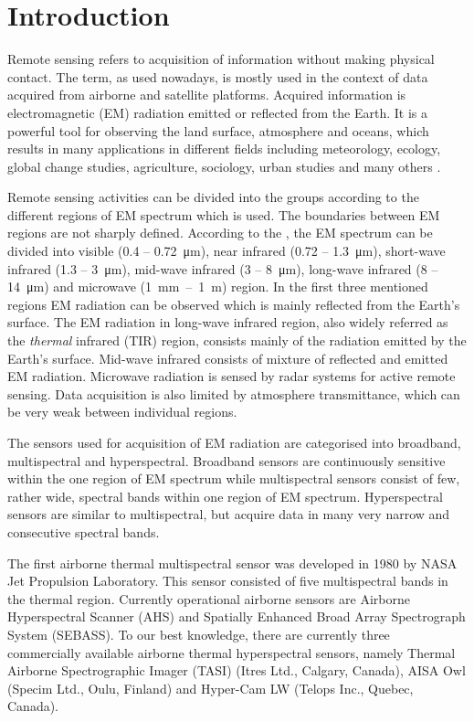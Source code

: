 \chapter*{Introduction}

Remote sensing refers to acquisition of information without making physical contact. The term, as used nowadays, is mostly used in the context of data acquired from airborne and satellite platforms. Acquired information is electromagnetic (EM) radiation emitted or reflected from the Earth. It is a powerful tool for observing the land surface, atmosphere and oceans, which results in many applications in different fields including meteorology, ecology, global change studies, agriculture, sociology, urban studies and many others \cite{VD01}.

Remote sensing activities can be divided into the groups according to the different regions of EM spectrum which is used. The boundaries between EM regions are not sharply defined. According to the \cite{Z14}, the EM spectrum can be divided into visible (0.4 – \SI{0.72}{\micro\meter}), near infrared (0.72 – \SI{1.3}{\micro\meter}), short-wave infrared (1.3 – \SI{3}{\micro\meter}), mid-wave infrared (3 – \SI{8}{\micro\meter}), long-wave infrared (8 – \SI{14}{\micro\meter}) and microwave (\SI{1}{\milli\meter}~–~\SI{1}{\meter}) region. In the first three mentioned regions EM radiation can be observed which is mainly reflected from the Earth's surface. The EM radiation in long-wave infrared region, also widely referred as the \textit{thermal} infrared (TIR) region, consists mainly of the radiation emitted by the Earth's surface. Mid-wave infrared consists of mixture of reflected and emitted EM radiation. Microwave radiation is sensed by radar systems for active remote sensing. Data acquisition is also limited by atmosphere transmittance, which can be very weak between individual regions.

The sensors used for acquisition of EM radiation are categorised into broadband, multispectral and hyperspectral. Broadband sensors are continuously sensitive within the one region of EM spectrum while multispectral sensors consist of few, rather wide, spectral bands within one region of EM spectrum. Hyperspectral sensors are similar to multispectral, but acquire data in many very narrow and consecutive spectral bands. 

The first airborne thermal multispectral sensor was developed in 1980 by NASA Jet Propulsion Laboratory. This sensor consisted of five multispectral bands in the thermal region. Currently operational airborne sensors are Airborne Hyperspectral Scanner (AHS) and Spatially Enhanced Broad Array Spectrograph System (SEBASS). To our best knowledge, there are currently three commercially available airborne thermal hyperspectral sensors, namely Thermal Airborne Spectrographic Imager (TASI) (Itres Ltd., Calgary, Canada), AISA Owl (Specim Ltd., Oulu, Finland) and Hyper-Cam LW (Telops Inc., Quebec, Canada).

